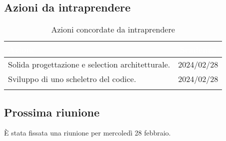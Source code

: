 \subsection{Azioni da intraprendere} \label{subsec:action}

{
\setlength{\tabcolsep}{10pt}
\renewcommand{\arraystretch}{1.5}
\begin{xltabular}{\textwidth}{| X | c |}
    \hline
     \textbf{\textcolor{white}{Azione}} & \textbf{\textcolor{white}{Scadenza}} \\
    \hline
    \endhead
    Solida progettazione e selection architetturale. & 2024/02/28\\
    \hline
    Sviluppo di uno scheletro del codice. & 2024/02/28\\
    \hline
     \caption{Azioni concordate da intraprendere}
    \label{tab:reqimp}
\end{xltabular}
}

\subsection{Prossima riunione} \label{subsec:riunione}
È stata fissata una riunione per mercoledì 28 febbraio.